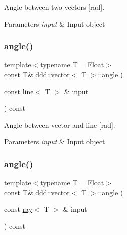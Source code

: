 Angle between two vectors \mbox{[}rad\mbox{]}. 


\begin{DoxyParams}{Parameters}
{\em input} & Input object \\
\hline
\end{DoxyParams}
\mbox{\label{classddd_1_1vector_a97a1359914c22ea1e3928f02fc650bac}} 
\subsubsection{\texorpdfstring{angle()}{angle()}\hspace{0.1cm}{\footnotesize\ttfamily [2/5]}}
{\footnotesize\ttfamily template$<$typename T = Float$>$ \\
const T\& \hyperlink{classddd_1_1vector}{ddd\+::vector}$<$ T $>$\+::angle (\begin{DoxyParamCaption}\item[{const \hyperlink{classddd_1_1line}{line}$<$ T $>$ \&}]{input }\end{DoxyParamCaption}) const\hspace{0.3cm}{\ttfamily [inline]}}



Angle between vector and line \mbox{[}rad\mbox{]}. 


\begin{DoxyParams}{Parameters}
{\em input} & Input object \\
\hline
\end{DoxyParams}
\mbox{\label{classddd_1_1vector_a893bfd1b0209a0a7e7630a3ddf38193d}} 
\subsubsection{\texorpdfstring{angle()}{angle()}\hspace{0.1cm}{\footnotesize\ttfamily [3/5]}}
{\footnotesize\ttfamily template$<$typename T = Float$>$ \\
const T\& \hyperlink{classddd_1_1vector}{ddd\+::vector}$<$ T $>$\+::angle (\begin{DoxyParamCaption}\item[{const \hyperlink{classddd_1_1ray}{ray}$<$ T $>$ \&}]{input }\end{DoxyParamCaption}) const\hspace{0.3cm}{\ttfamily [inline]}}



